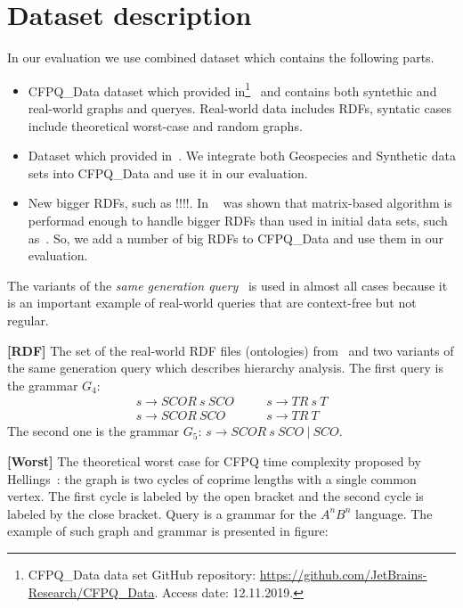 \section{Dataset description}

In our evaluation we use combined dataset which contains the following parts.
\begin{itemize}
\item CFPQ\_Data dataset which provided in\footnote{CFPQ\_Data data set GitHub repository: \url{https://github.com/JetBrains-Research/CFPQ_Data}. Access date: 12.11.2019.}~\cite{Mishin:2019:ECP:3327964.3328503} and contains both syntethic and real-world graphs and queryes.
Real-world data includes RDFs, syntatic cases include theoretical worst-case and random graphs.
\item Dataset which provided in~\cite{Kuijpers:2019:ESC:3335783.3335791}. We integrate both Geospecies and Synthetic data sets into CFPQ\_Data and use it in our evaluation.
\item New bigger RDFs, such as !!!!. 
In ~\cite{Mishin:2019:ECP:3327964.3328503} was shown that matrix-based algorithm is performad enough to handle bigger RDFs than used in initial data sets, such as~\cite{RDF}. 
So, we add a number of big RDFs to CFPQ\_Data and use them in our evaluation. 
\end{itemize}

The variants of the \textit{same generation query}~\cite{FndDB} is used in almost all cases because it is an important example of real-world queries that are context-free but not regular.

\textbf{[RDF]} The set of the real-world RDF files (ontologies) from~\cite{RDF} and two variants of the same generation query which describes hierarchy analysis.
The first query is the grammar $G_4$:
\[
 \begin{array}{lcl}
   s  \rightarrow \textit{SCOR} \ s \ \textit{SCO}   & \quad & s  \rightarrow \textit{TR} \ s \ \textit{T}     \\
   s  \rightarrow \textit{SCOR} \ \textit{SCO}       & \quad & s  \rightarrow  \textit{TR}  \ \textit{T}

 \end{array}
 \]
The second one is the grammar $G_5$: $s \rightarrow \textit{SCOR} \ s \ \textit{SCO} \ | \  \textit{SCO}$.

\textbf{[Worst]} The theoretical worst case for CFPQ time complexity proposed by Hellings~\cite{hellingsPathQuerying}: the graph is two cycles of coprime lengths with a single common vertex.
The first cycle is labeled by the open bracket and the second cycle is labeled by the close bracket.
Query is a grammar for the $A^nB^n$ language.
The example of such graph and grammar is presented in figure:

